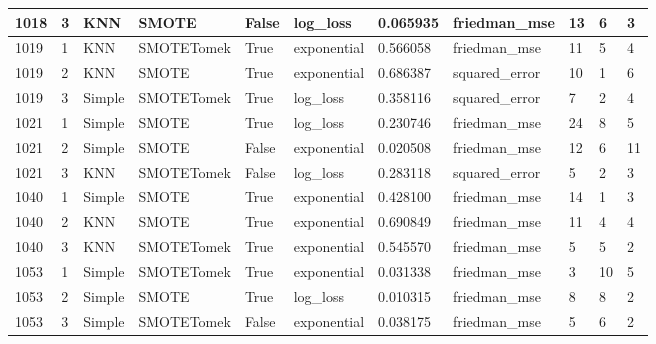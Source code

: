 \documentclass[11pt]{article}
\begin{document}
\begin{table}
\begin{tabular}{lllllllllll}
      1018 &       3 &     KNN &      SMOTE &  False &    log\_loss &       0.065935 &  friedman\_mse &                    13 &                    6 &         3 \\
\midrule
      1019 &       1 &     KNN & SMOTETomek &   True & exponential &       0.566058 &  friedman\_mse &                    11 &                    5 &         4 \\
      1019 &       2 &     KNN &      SMOTE &   True & exponential &       0.686387 & squared\_error &                    10 &                    1 &         6 \\
      1019 &       3 &  Simple & SMOTETomek &   True &    log\_loss &       0.358116 & squared\_error &                     7 &                    2 &         4 \\
\midrule
      1021 &       1 &  Simple &      SMOTE &   True &    log\_loss &       0.230746 &  friedman\_mse &                    24 &                    8 &         5 \\
      1021 &       2 &  Simple &      SMOTE &  False & exponential &       0.020508 &  friedman\_mse &                    12 &                    6 &        11 \\
      1021 &       3 &     KNN & SMOTETomek &  False &    log\_loss &       0.283118 & squared\_error &                     5 &                    2 &         3 \\
\midrule
      1040 &       1 &  Simple &      SMOTE &   True & exponential &       0.428100 &  friedman\_mse &                    14 &                    1 &         3 \\
      1040 &       2 &     KNN &      SMOTE &   True & exponential &       0.690849 &  friedman\_mse &                    11 &                    4 &         4 \\
      1040 &       3 &     KNN & SMOTETomek &   True & exponential &       0.545570 &  friedman\_mse &                     5 &                    5 &         2 \\
\midrule
      1053 &       1 &  Simple & SMOTETomek &   True & exponential &       0.031338 &  friedman\_mse &                     3 &                   10 &         5 \\
      1053 &       2 &  Simple &      SMOTE &   True &    log\_loss &       0.010315 &  friedman\_mse &                     8 &                    8 &         2 \\
      1053 &       3 &  Simple & SMOTETomek &  False & exponential &       0.038175 &  friedman\_mse &                     5 &                    6 &         2 \\

\end{tabular}
\end{table}
\end{document}
